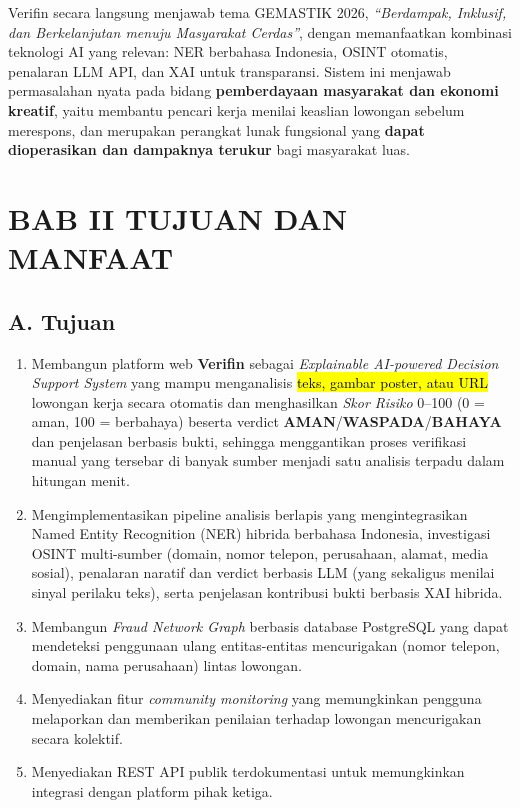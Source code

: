 \documentclass[12pt,a4paper]{article}
\newcommand{\revisi}[1]{\hl{#1}}
\begin{document}
Verifin secara langsung menjawab tema GEMASTIK 2026, \textit{``Berdampak, Inklusif, dan
Berkelanjutan menuju Masyarakat Cerdas''}, dengan memanfaatkan kombinasi teknologi AI
yang relevan: NER berbahasa Indonesia, OSINT otomatis, penalaran LLM API, dan XAI untuk
transparansi. Sistem ini menjawab permasalahan nyata pada bidang \textbf{pemberdayaan masyarakat
dan ekonomi kreatif}, yaitu membantu pencari kerja menilai keaslian lowongan sebelum merespons,
dan merupakan perangkat lunak fungsional yang \textbf{dapat
dioperasikan dan dampaknya terukur} bagi masyarakat luas.

\vspace{0.1cm}


\section*{BAB II TUJUAN DAN MANFAAT}

\subsection*{A. Tujuan}

\begin{enumerate}[label=\textbf{\arabic*.}]
\item Membangun platform web \textbf{Verifin} sebagai \textit{Explainable AI-powered Decision
      Support System} yang mampu menganalisis \revisi{teks, gambar poster, atau URL} lowongan kerja secara otomatis dan
      menghasilkan \textit{Skor Risiko} 0--100 (0 = aman, 100 = berbahaya) beserta verdict
      \textbf{AMAN}\allowbreak/\textbf{WASPADA}\allowbreak/\textbf{BAHAYA} dan penjelasan berbasis
      bukti, sehingga menggantikan proses verifikasi manual yang tersebar di banyak sumber
      menjadi satu analisis terpadu dalam hitungan menit.

\item Mengimplementasikan pipeline analisis berlapis yang mengintegrasikan Named Entity Recognition
      (NER) hibrida berbahasa Indonesia, investigasi OSINT multi-sumber
      (domain, nomor telepon, perusahaan, alamat, media sosial), penalaran naratif dan verdict
      berbasis LLM (yang sekaligus menilai sinyal perilaku teks), serta penjelasan kontribusi
      bukti berbasis XAI hibrida.

\item Membangun \textit{Fraud Network Graph} berbasis database PostgreSQL yang dapat mendeteksi
      penggunaan ulang entitas-entitas mencurigakan (nomor telepon, domain, nama perusahaan) lintas
      lowongan.

\item Menyediakan fitur \textit{community monitoring} yang memungkinkan pengguna melaporkan dan
      memberikan penilaian terhadap lowongan mencurigakan secara kolektif.

\item Menyediakan REST API publik terdokumentasi untuk memungkinkan integrasi dengan platform
      pihak ketiga.
\end{enumerate}
\end{document}
